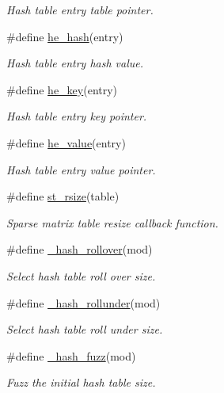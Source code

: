 \begin{CompactItemize}
\begin{CompactList}\small\item\em Hash table entry table pointer. \item\end{CompactList}\item 
\#define \hyperlink{group__dbprim__hash_ga42}{he\_\-hash}(entry)
\begin{CompactList}\small\item\em Hash table entry hash value. \item\end{CompactList}\item 
\#define \hyperlink{group__dbprim__hash_ga43}{he\_\-key}(entry)
\begin{CompactList}\small\item\em Hash table entry key pointer. \item\end{CompactList}\item 
\#define \hyperlink{group__dbprim__hash_ga44}{he\_\-value}(entry)
\begin{CompactList}\small\item\em Hash table entry value pointer. \item\end{CompactList}\item 
\#define \hyperlink{group__dbprim__hash_ga45}{st\_\-rsize}(table)
\begin{CompactList}\small\item\em Sparse matrix table resize callback function. \item\end{CompactList}\item 
\#define \hyperlink{group__dbprim__hash_ga46}{\_\-hash\_\-rollover}(mod)
\begin{CompactList}\small\item\em Select hash table roll over size. \item\end{CompactList}\item 
\#define \hyperlink{group__dbprim__hash_ga47}{\_\-hash\_\-rollunder}(mod)
\begin{CompactList}\small\item\em Select hash table roll under size. \item\end{CompactList}\item 
\#define \hyperlink{group__dbprim__hash_ga48}{\_\-hash\_\-fuzz}(mod)
\begin{CompactList}\small\item\em Fuzz the initial hash table size. \item\end{CompactList}\item 

\end{CompactItemize}
